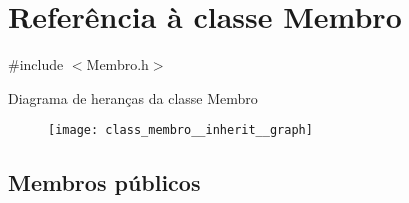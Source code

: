 \hypertarget{class_membro}{\section{Referência à classe Membro}
\label{class_membro}
}


{\ttfamily \#include $<$Membro.\+h$>$}



Diagrama de heranças da classe Membro\nopagebreak
\begin{figure}[H]
\begin{center}
\leavevmode
\texttt{[image: class\_membro\_\_inherit\_\_graph]}
\end{center}
\end{figure}
\subsection*{Membros públicos}
